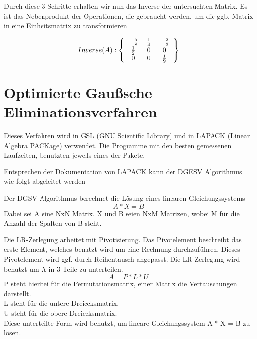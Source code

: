 Durch diese 3 Schritte erhalten wir nun das Inverse der untersuchten Matrix. Es ist das Nebenprodukt der Operationen, die gebraucht werden, um die ggb. Matrix in eine Einheitsmatrix zu transformieren.

\[
Inverse(A): 
	\left\{\begin{tabular}{ccc}
	$-\frac{5}{8}$ & $\frac{1}{4}$ & $-\frac{2}{3}$ \\
	$\frac{1}{2}$ & 0 & 0\\
	0 & 0 & $\frac{1}{9}$
\end{tabular}
\right\}
\]

\section{Optimierte Gaußsche Eliminationsverfahren}
Dieses Verfahren wird in GSL (GNU Scientific Library) und in LAPACK (Linear Algebra PACKage) verwendet. Die Programme mit den besten gemessenen Laufzeiten, benutzten jeweils eines der Pakete.

Entsprechen der Dokumentation von LAPACK\cite{.13.11.2017} kann der DGESV Algorithmus wie folgt abgeleitet werden:

Der DGSV Algorithmus berechnet die Lösung eines linearen Gleichungssystems
\[A * X = B\]
Dabei sei A eine NxN Matrix. X und B seien NxM Matrizen, wobei M für die Anzahl der Spalten von B steht.

Die LR-Zerlegung 
arbeitet mit Pivotisierung. Das Pivotelement beschreibt das erste Element, welches benutzt wird um eine Rechnung durchzuführen. Dieses Pivotelement wird ggf. durch Reihentausch angepasst. Die LR-Zerlegung wird benutzt um A in 3 Teile zu unterteilen.
\[A = P * L * U\]
P steht hierbei für die  Permutationsmatrix, einer Matrix die Vertauschungen darstellt.\\L steht für die untere Dreiecksmatrix.\\ U steht für die obere Dreiecksmatrix.\\
Diese unterteilte Form wird benutzt, um lineare Gleichungssystem A * X = B zu lösen.
